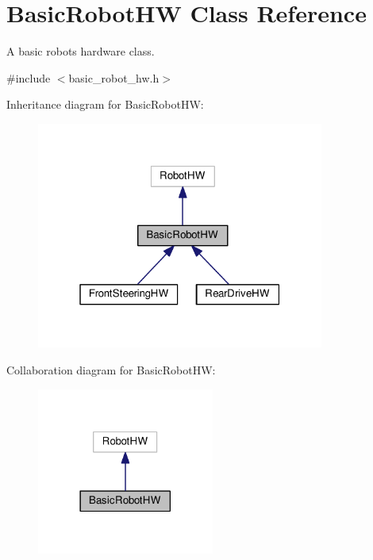 \hypertarget{classBasicRobotHW}{}\section{Basic\+Robot\+HW Class Reference}
\label{classBasicRobotHW}


A basic robot\textquotesingle{}s hardware class.  




{\ttfamily \#include $<$basic\+\_\+robot\+\_\+hw.\+h$>$}



Inheritance diagram for Basic\+Robot\+HW\+:
\nopagebreak
\begin{figure}[H]
\begin{center}
\leavevmode
\includegraphics[width=268pt]{classBasicRobotHW__inherit__graph}
\end{center}
\end{figure}


Collaboration diagram for Basic\+Robot\+HW\+:
\nopagebreak
\begin{figure}[H]
\begin{center}
\leavevmode
\includegraphics[width=165pt]{classBasicRobotHW__coll__graph}
\end{center}
\end{figure}
